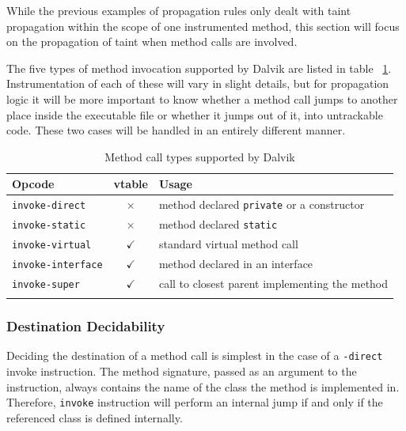 \documentclass[12pt,twoside,notitlepage]{report}
\newcommand{\tick}{$\checkmark$}
\newcommand{\cross}{$\times$}
\begin{document}
While the previous examples of propagation rules only dealt with taint propagation within the scope of one instrumented method, this section will focus on the propagation of taint when method calls are involved. 

The five types of method invocation supported by Dalvik are listed in table ~\ref{table:TaintPropagation_MethodCallTypes}. Instrumentation of each of these will vary in slight details, but for propagation logic it will be more important to know whether a method call jumps to another place inside the executable file or whether it jumps out of it, into untrackable code. These two cases will be handled in an entirely different manner. 

\begin{table}
	\begin{center}
	\begin{tabular}{|l|c|l|}
		\firsthline
		\textbf{Opcode}         & \footnotesize{\textbf{vtable}} & \textbf{Usage} \\
		\hline
		\verb$invoke-direct$    & \cross          & method declared \verb$private$ or a constructor \\
		\verb$invoke-static$    & \cross          & method declared \verb$static$ \\
		\hline
		\verb$invoke-virtual$   & \tick           & standard virtual method call \\
		\verb$invoke-interface$ & \tick           & method declared in an interface \\
		\verb$invoke-super$     & \tick           & call to closest parent implementing the method \\
		\lasthline
	\end{tabular}
	\end{center}
	\caption{Method call types supported by Dalvik}
	\label{table:TaintPropagation_MethodCallTypes}
\end{table}

\subsubsection{Destination Decidability}

Deciding the destination of a method call is simplest in the case of a \verb$-direct$ invoke instruction. The method signature, passed as an argument to the instruction, always contains the name of the class the method is implemented in. Therefore, \verb$invoke$ instruction will perform an internal jump if and only if the referenced class is defined internally.
\end{document}

